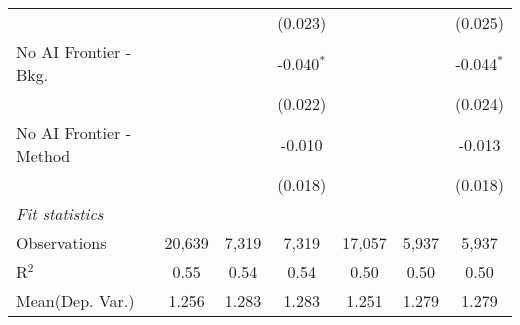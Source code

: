 \begin{tabular}{lcccccc}
                           &               &         & (0.023)       &               &         & (0.025)\\   
   No AI Frontier - Bkg.   &               &         & -0.040$^{*}$  &               &         & -0.044$^{*}$\\   
                           &               &         & (0.022)       &               &         & (0.024)\\   
   No AI Frontier - Method &               &         & -0.010        &               &         & -0.013\\   
                           &               &         & (0.018)       &               &         & (0.018)\\   
   \midrule
   \emph{Fit statistics}\\
   Observations            & 20,639        & 7,319   & 7,319         & 17,057        & 5,937   & 5,937\\  
   R$^2$                   & 0.55          & 0.54    & 0.54          & 0.50          & 0.50    & 0.50\\  
Mean(Dep. Var.) & 1.256 & 1.283 & 1.283 & 1.251 & 1.279 & 1.279 \\
   

\end{tabular}
